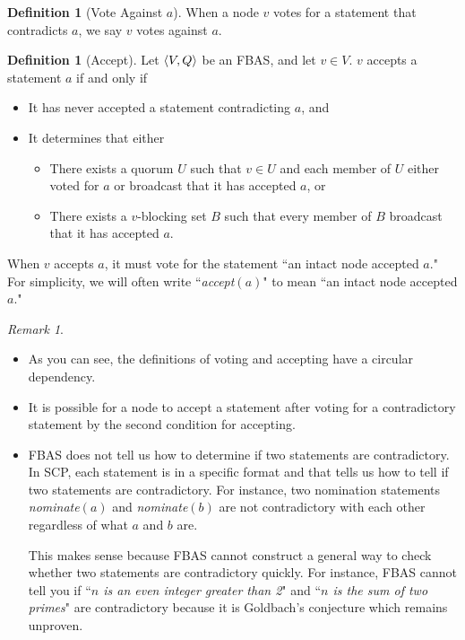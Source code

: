\documentclass[12pt, psamsfonts]{amsart}
\theoremstyle{definition}
\newtheorem{defn}[thm]{Definition}
\theoremstyle{remark}
\newtheorem{rem}[thm]{Remark}
\numberwithin{equation}{subsection}
\begin{document}
\begin{defn}[Vote Against $a$]\label{def_vote_against_a}
    When a node $v$ votes for a statement that contradicts $a$, we say $v$ votes against $a$.
\end{defn}

\begin{defn}[Accept]\label{def_accept}
    Let $\ev{V, Q}$ be an FBAS\@, and let $v \in V$.
    $v$ accepts a statement $a$ if and only if 
    \begin{itemize}
        \item
            It has never accepted a statement contradicting $a$, and
        \item
            It determines that either
            \begin{itemize}
                \item
                    There exists a quorum $U$ such that $v \in U$ and each member of $U$ either voted for $a$ or broadcast that it has accepted $a$, or
                \item
                    There exists a $v$-blocking set $B$ such that every member of $B$ broadcast that it has accepted $a$.
            \end{itemize}
    \end{itemize}

    When $v$ accepts $a$, it must vote for the statement ``an intact node accepted $a$."
    For simplicity, we will often write ``\textit{accept}$(a)$" to mean ``an intact node accepted $a$."
\end{defn}

\begin{rem}
    $ $
    \begin{itemize}
        \item
            As you can see, the definitions of voting and accepting have a circular dependency.
        \item
            It is possible for a node to accept a statement after voting for a contradictory statement by the second condition for accepting.
        \item
            FBAS does not tell us how to determine if two statements are contradictory.
            In SCP, each statement is in a specific format and that tells us how to tell if two statements are contradictory.
            For instance, two nomination statements \textit{nominate}$(a)$ and \textit{nominate}$(b)$ are not contradictory with each other regardless of what $a$ and $b$ are.

            This makes sense because FBAS cannot construct a general way to check whether two statements are contradictory quickly.
            For instance, FBAS cannot tell you if ``\textit{$n$ is an even integer greater than 2}" and ``\textit{$n$ is the sum of two primes}" are contradictory because it is Goldbach's conjecture which remains unproven.
    \end{itemize}
\end{rem}
\end{document}
